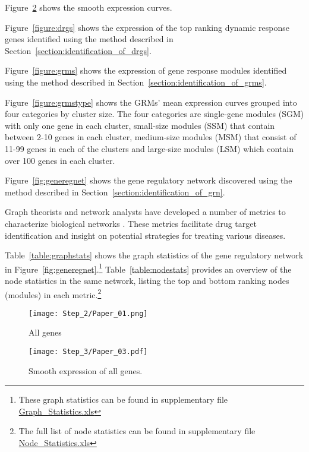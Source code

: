 

Figure~\ref{fig:smoothexp} shows the smooth expression curves.

Figure~\ref{figure:drgs} shows the expression of the top ranking dynamic response genes identified using the method described in Section~\ref{section:identification_of_drgs}.

Figure~\ref{figure:grms} shows the expression of gene response modules identified using the method described in Section~\ref{section:identification_of_grms}.

Figure~\ref{figure:grmstype} shows the GRMs' mean expression curves grouped into four categories by cluster size. The four categories are single-gene modules (SGM) with only one gene in each cluster, small-size modules (SSM) that contain between 2-10 genes in each cluster, medium-size modules (MSM) that consist of 11-99 genes in each of the clusters and large-size modules (LSM) which contain over 100 genes in each cluster.

Figure~\ref{fig:generegnet} shows the gene regulatory network discovered using the method described in Section~\ref{section:identification_of_grn}.

Graph theorists and network analysts have developed a number of metrics to characterize biological networks \cite{huber2007graphs, lee2004coexpression}. These metrics facilitate drug target identification and insight on potential strategies for treating various diseases.

Table~\ref{table:graphstats} shows the graph statistics of the gene regulatory network in Figure~\ref{fig:generegnet}.\footnote{These graph statistics can be found in supplementary file \href{Step_7/Graph\_Statistics.xls}{Graph\_Statistics.xls}} Table~\ref{table:nodestats} provides an overview of the node statistics in the same network, listing the top and bottom ranking nodes (modules) in each metric.\footnote{The full list of node statistics can be found in supplementary file \href{Step_7/Node\_Statistics.xls}{Node\_Statistics.xls}}

\begin{figure}
\centering
\texttt{[image: Step\_2/Paper\_01.png]}
\caption{All genes}
\label{fig:allgenes}
\end{figure}

\begin{figure}
\texttt{[image: Step\_3/Paper\_03.pdf]}
\caption{Smooth expression of all genes.}
\label{fig:smoothexp}
\end{figure}

